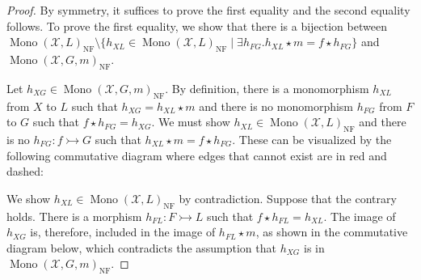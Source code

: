 \begin{proof}
    By symmetry, it suffices to prove the first equality and the second equality follows. To prove the first equality, we show that there is a bijection between $\operatorname{Mono}(\mathcal{X},L)_{\operatorname{NF}} \mathop{\setminus} \{
                h_{XL} \mathop{\in} \operatorname{Mono}(\mathcal{X},L)_{\operatorname{NF}} \mathop{\mid} 
                \exists h_{FG}. h_{XL} \mathop{\star} m \mathop{=} f \mathop{\star} h_{FG}
            \}$ and $\operatorname{Mono}(\mathcal{X},G,m)_{\operatorname{NF}}$.

    Let $h_{XG} \mathop{\in} \operatorname{Mono}(\mathcal{X},G,m)_{\operatorname{NF}}$. By definition, there is a monomorphism $h_{XL}$ from $X$ to $L$ such that $h_{XG} \mathop{=} h_{XL} \mathop{\star} m$ and there is no monomorphism $h_{FG}$ from $F$ to $G$ such that $f \mathop{\star} h_{FG} \mathop{=} h_{XG}$. We must show $h_{XL} \mathop{\in} \operatorname{Mono}(\mathcal{X},L)_{\operatorname{NF}}$ and there is no $h_{FG}:f \rightarrowtail G$ such that $h_{XL} \mathop{\star} m \mathop{=} f \mathop{\star} h_{FG}$. These can be visualized by the following commutative diagram where edges that cannot exist are in red and dashed:

    \begin{center}
    \end{center}
    
    We show $h_{XL} \mathop{\in} \operatorname{Mono}(\mathcal{X},L)_{\operatorname{NF}}$ by contradiction. Suppose that the contrary holds. There is a morphism $h_{FL}: F \rightarrowtail L$ such that $f \mathop{\star} h_{FL} \mathop{=} h_{XL}$.
    The image of $h_{XG}$ is, therefore, included in the image of $h_{FL} \mathop{\star} m$, as shown in the commutative diagram below, which contradicts the assumption that $h_{XG}$ is in $\operatorname{Mono}(\mathcal{X},G,m)_{\operatorname{NF}}$. 


\end{proof}
